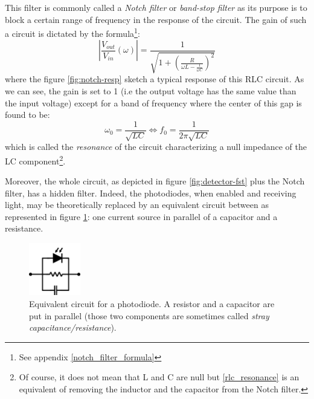 \documentclass[11pt]{report}
\begin{document}
This filter is commonly called a \textit{Notch filter} or \textit{band-stop filter} as its purpose is to block a certain range of frequency in the response of the circuit. The gain of such a circuit is dictated by the formula\footnote{See appendix \ref{notch_filter_formula}}:
\begin{equation}
\left\lvert \frac{V_{out}}{V_{in}} (\omega) \right\rvert = \frac{1}{\sqrt{1 + \left(\frac{R}{\omega L - \frac{1}{\omega C}}\right)^2}}
\end{equation}
where the figure \ref{fig:notch-resp} sketch a typical response of this RLC circuit. As we can see, the gain is set to 1 (i.e the output voltage has the same value than the input voltage) except for a band of frequency where the center of this gap is found to be:
\begin{equation}
\label{rlc_resonance}
\omega_0 = \frac{1}{\sqrt{LC}} \Leftrightarrow f_0 = \frac{1}{2\pi\sqrt{LC}}
\end{equation}
which is called the \textit{resonance} of the circuit characterizing a null impedance of the LC component\footnote{Of course, it does not mean that L and C are null but \eqref{rlc_resonance} is an equivalent of removing the inductor and the capacitor from the Notch filter.}.

Moreover, the whole circuit, as depicted in figure \ref{fig:detector-fst} plus the Notch filter, has a hidden filter. Indeed, the photodiodes, when enabled and receiving light, may be theoretically replaced by an equivalent circuit between as represented in figure \ref{fig:equiv-diode}: one current source in parallel of a capacitor and a resistance.

\begin{figure}[h!]
\centering
\includegraphics[width=0.2\textwidth]{equiv-diode}
\caption{Equivalent circuit for a photodiode. A resistor and a capacitor are put in parallel (those two components are sometimes called \textit{stray capacitance/resistance}).}
\label{fig:equiv-diode}
\end{figure}
\end{document}
